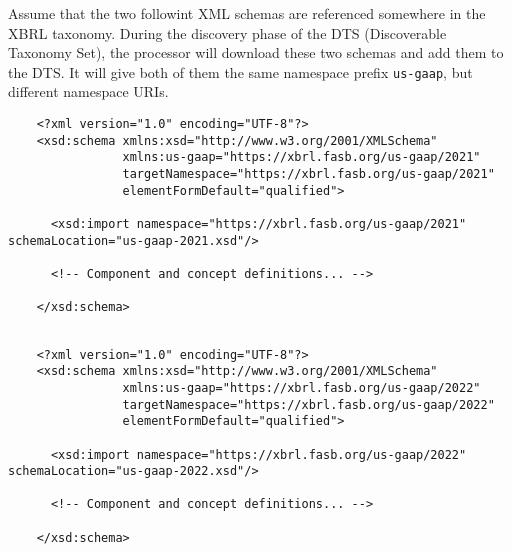 



Assume that the two followint XML schemas are referenced somewhere in the XBRL taxonomy. During the discovery phase of the DTS (Discoverable Taxonomy Set),
the processor will download these two schemas and add them to the DTS. It will give both of them the same namespace prefix \texttt{us-gaap}, but different namespace URIs.

\begin{lstlisting}
    <?xml version="1.0" encoding="UTF-8"?>
    <xsd:schema xmlns:xsd="http://www.w3.org/2001/XMLSchema"
                xmlns:us-gaap="https://xbrl.fasb.org/us-gaap/2021"
                targetNamespace="https://xbrl.fasb.org/us-gaap/2021"
                elementFormDefault="qualified">
    
      <xsd:import namespace="https://xbrl.fasb.org/us-gaap/2021" schemaLocation="us-gaap-2021.xsd"/>
    
      <!-- Component and concept definitions... -->
    
    </xsd:schema>
    

\end{lstlisting}

\begin{lstlisting}
    <?xml version="1.0" encoding="UTF-8"?>
    <xsd:schema xmlns:xsd="http://www.w3.org/2001/XMLSchema"
                xmlns:us-gaap="https://xbrl.fasb.org/us-gaap/2022"
                targetNamespace="https://xbrl.fasb.org/us-gaap/2022"
                elementFormDefault="qualified">
    
      <xsd:import namespace="https://xbrl.fasb.org/us-gaap/2022" schemaLocation="us-gaap-2022.xsd"/>
    
      <!-- Component and concept definitions... -->
    
    </xsd:schema>
    

\end{lstlisting}

